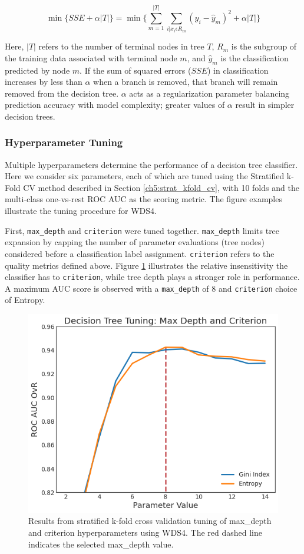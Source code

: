 \begin{equation}
\min{\{SSE + \alpha\left|T\right|\}} = \min\Bigg\{ \sum_{m=1}^{\left|T\right|}{\sum_{i|x_i\epsilon R_m}}{(y_i-\hat{y}_m)^2+ \alpha\left|T\right|\Bigg\}}
\end{equation}

Here, $\left|T\right|$ refers to the number of terminal nodes in tree $T$, $R_m$ is the subgroup of the training data associated with terminal node $m$, and $\hat{y}_m$ is the classification predicted by node $m$. If the sum of squared errors ($SSE$) in classification increases by less than $\alpha$ when a branch is removed, that branch will remain removed from the decision tree. $\alpha$ acts as a regularization parameter balancing prediction accuracy with model complexity; greater values of $\alpha$ result in simpler decision trees.

\subsubsection{Hyperparameter Tuning}
Multiple hyperparameters determine the performance of a decision tree classifier. Here we consider six parameters, each of which are tuned using the Stratified k-Fold CV method described in Section \ref{ch5:strat_kfold_cv}, with 10 folds and the multi-class one-vs-rest ROC AUC as the scoring metric. The figure examples illustrate the tuning procedure for WDS4.

First, \verb|max_depth| and \verb|criterion| were tuned together. \verb|max_depth| limits tree expansion by capping the number of parameter evaluations (tree nodes) considered before a classification label assignment. \verb|criterion| refers to the quality metrics defined above. Figure \ref{fig:dtree_maxdepth} illustrates the relative insensitivity the classifier has to \verb|criterion|, while tree depth plays a stronger role in performance. A maximum AUC score is observed with a \verb|max_depth| of 8 and \verb|criterion| choice of Entropy.

\begin{figure}[!htp]
\centering
\includegraphics[width=.6\textwidth]{templates/images/Figure-DT_tuning_maxdepth_criterion.png}
\caption[Decision tree max depth tuning]{Results from stratified k-fold cross validation tuning of max\_depth and criterion hyperparameters using WDS4. The red dashed line indicates the selected max\_depth value.}
\label{fig:dtree_maxdepth}
\end{figure}

